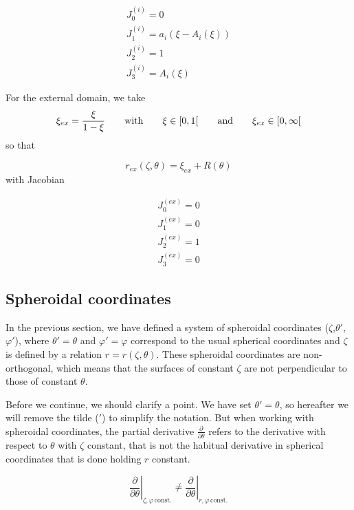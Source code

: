 \begin{equation}
\begin{array}{l}
J_0^{(i)}=0\\
J_1^{(i)}=a_i(\xi-A_i(\xi))\\
J_2^{(i)}=1\\
J_3^{(i)}=A_i(\xi)
\end{array}
\end{equation}

For the external domain, we take 
\begin{equation}
\xi_{ex}=\frac{\xi}{1-\xi} {\qquad {\rm with}\qquad} \xi\in[0,1[ \qquad {\rm and}\qquad \xi_{ex}\in[0,\infty[
\end{equation}
so that

\begin{equation}
r_{ex}(\zeta,\theta)=\xi_{ex}+R(\theta)
\end{equation}
with Jacobian

\begin{equation}
\begin{array}{l}
J_0^{(ex)}=0\\
J_1^{(ex)}=0\\
J_2^{(ex)}=1\\
J_3^{(ex)}=0
\end{array}
\end{equation}

\subsection{Spheroidal coordinates}

In the previous section, we have defined a system of spheroidal
coordinates ($\zeta$,$\theta'$,$\varphi'$), where $\theta'=\theta$ and
$\varphi'=\varphi$ correspond to the usual spherical coordinates and
$\zeta$ is defined by a relation $r=r(\zeta,\theta)$. These spheroidal
coordinates are non-orthogonal, which means that the surfaces of constant
$\zeta$ are not perpendicular to those of constant $\theta$.

Before we continue, we should clarify a point. We have set
$\theta'=\theta$, so hereafter we will remove the tilde ($'$) to simplify
the notation. But when working with spheroidal coordinates, the partial
derivative $\frac{\partial}{\partial\theta}$ refers to the derivative
with respect to $\theta$ with $\zeta$ constant, that is not the habitual
derivative in spherical coordinates that is done holding $r$ constant.

$$\left.\frac{\partial}{\partial\theta}\right|_{\zeta,\varphi\,\mathrm{const.}}\ne
\left.\frac{\partial}{\partial\theta}\right|_{r,\varphi\,\mathrm{const.}}$$


